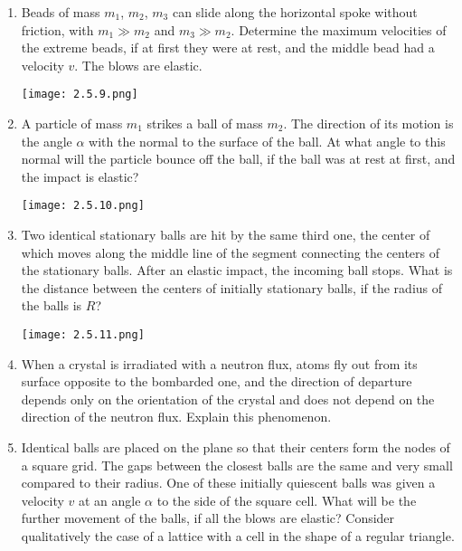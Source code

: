\documentclass{article}
\begin{document}
\begin{enumerate}[label=2.5.\arabic*]
\item Beads of mass $m_1$, $m_2$, $m_3$ can slide along the horizontal spoke without friction, with $m_1 \gg m_2$ and $m_3 \gg m_2$. Determine the maximum velocities of the extreme beads, if at first they were at rest, and the middle bead had a velocity $v$. The blows are elastic.

\begin{center}
    \texttt{[image: 2.5.9.png]}
\end{center}

\item A particle of mass $m_1$ strikes a ball of mass $m_2$. The direction of its motion is the angle $\alpha$ with the normal to the surface of the ball. At what angle to this normal will the particle bounce off the ball, if the ball was at rest at first, and the impact is elastic?

\begin{center}
    \texttt{[image: 2.5.10.png]}
\end{center}

\item Two identical stationary balls are hit by the same third one, the center of which moves along the middle line of the segment connecting the centers of the stationary balls. After an elastic impact, the incoming ball stops. What is the distance between the centers of initially stationary balls, if the radius of the balls is $R$?

\begin{center}
    \texttt{[image: 2.5.11.png]}
\end{center}

\item When a crystal is irradiated with a neutron flux, atoms fly out from its surface opposite to the bombarded one, and the direction of departure depends only on the orientation of the crystal and does not depend on the direction of the neutron flux. Explain this phenomenon.

\item Identical balls are placed on the plane so that their centers form the nodes of a square grid. The gaps between the closest balls are the same and very small compared to their radius. One of these initially quiescent balls was given a velocity $v$ at an angle $\alpha$ to the side of the square cell. What will be the further movement of the balls, if all the blows are elastic? Consider qualitatively the case of a lattice with a cell in the shape of a regular triangle.


\end{enumerate}
\end{document}
